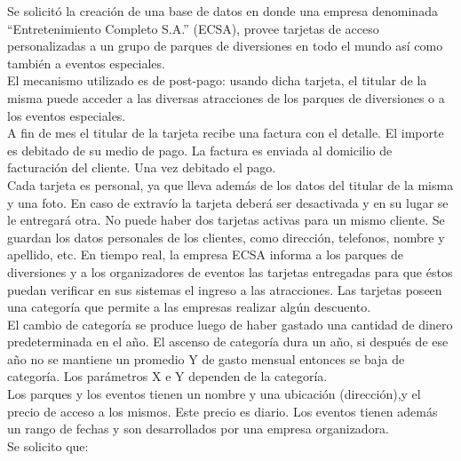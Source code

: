 Se solicitó la creación de una base de datos en donde una empresa denominada “Entretenimiento Completo S.A.” (ECSA), provee tarjetas de acceso
personalizadas a un grupo de parques de diversiones en todo el mundo así como
también a eventos especiales.\\
El mecanismo utilizado es de post-pago: usando dicha tarjeta, el titular de la misma puede acceder a las diversas atracciones de los parques de diversiones o a los eventos especiales.\\
A fin de mes el titular de la tarjeta recibe una factura con el detalle. El importe es debitado de su medio de pago. La factura es enviada al domicilio de facturación del cliente. Una vez debitado el pago.\\
Cada tarjeta es personal, ya que lleva además de los datos del titular de la
misma y una foto. En caso de extravío la tarjeta deberá ser desactivada y en su
lugar se le entregará otra. No puede haber dos tarjetas activas para un mismo
cliente. Se guardan los datos personales de los clientes, como dirección, telefonos, nombre y apellido, etc. En tiempo real, la empresa ECSA informa a los parques de diversiones y a los organizadores de eventos las tarjetas entregadas para que éstos puedan verificar en sus sistemas el ingreso a las atracciones.
Las tarjetas poseen una categoría que permite a las empresas realizar algún descuento. \\
El cambio de categoría se produce luego de haber gastado una cantidad de dinero predeterminada en el año.  El ascenso de categoría dura un año, si después de ese año no se mantiene un promedio Y de gasto mensual entonces se baja de categoría. Los parámetros X e Y dependen de la categoría.\\
Los parques y los eventos tienen un nombre y una ubicación (dirección),y el
precio de acceso a los mismos. Este precio es diario. Los eventos tienen además
un rango de fechas y son desarrollados por una empresa organizadora.\\

Se solicito que:\\


